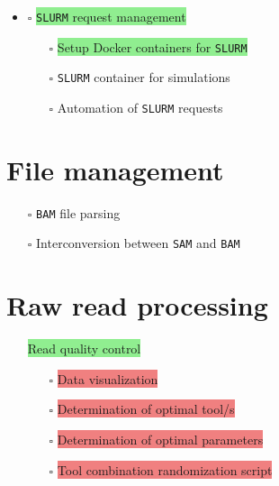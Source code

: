 \documentclass[11pt]{report}
\newcommand{\done}{\checkmark}  %
\newcommand{\pending}{$\square$}  %
\newcommand{\highlightessential}[1]{\colorbox{lightgreen}{#1}}  %
\newcommand{\highlightoptional}[1]{\colorbox{lightorange}{#1}}  %
\newcommand{\highlightrobust}[1]{\colorbox{lightcoral}{#1}}  %
\begin{document}
\begin{multicols}{2}
\begin{itemize}
\begin {itemize}
		
	\end{itemize}
		\item [\pending] \highlightessential{\texttt{SLURM} request management}
		\begin{itemize}
			\item [\pending] \highlightessential{Setup Docker containers for \texttt{SLURM}}
			\item [\pending] \highlightoptional{\texttt{SLURM} container for simulations}
			\item [\pending] \highlightoptional{Automation of \texttt{SLURM} requests}
		\end{itemize}

	\end{itemize}
	
\section*{File management}
\begin{itemize}
	\item [\pending] \highlightoptional{\texttt{BAM} file parsing}
	\item [\pending] \highlightoptional{Interconversion between \texttt{SAM} and \texttt{BAM}}
\end{itemize}

\section*{Raw read processing}
\begin{itemize}
	\item [\done] \highlightessential{Read quality control}
	\begin{itemize}
		\item [\pending] \highlightrobust{Data visualization}
		\item [\pending] \highlightrobust{Determination of optimal tool/s}
		\item [\pending] \highlightrobust{Determination of optimal parameters}
		\item [\pending] \highlightrobust{Tool combination randomization script}
	\end{itemize}
\end{itemize}
	

\end{multicols}
\end{document}
